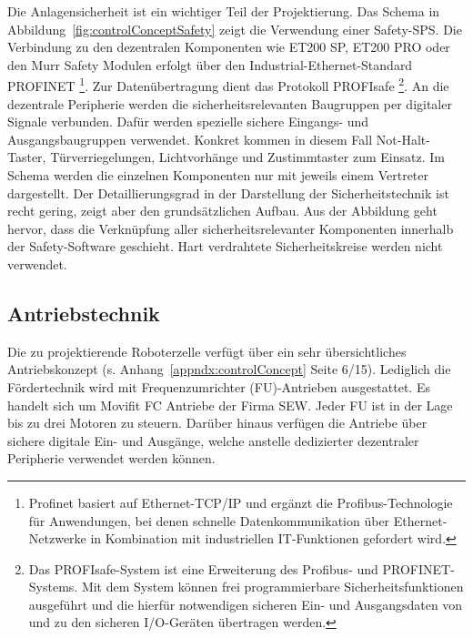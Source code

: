 Die Anlagensicherheit ist ein wichtiger Teil der Projektierung. Das Schema in Abbildung~\ref{fig:controlConceptSafety} zeigt die Verwendung einer Safety-SPS. Die Verbindung zu den dezentralen Komponenten wie ET200 SP, ET200 PRO oder den Murr Safety Modulen erfolgt über den Industrial-Ethernet-Standard PROFINET
\footnote{Profinet basiert auf Ethernet-TCP/IP und ergänzt die Profibus-Technologie für Anwendungen, bei denen schnelle Datenkommunikation über Ethernet-Netzwerke in Kombination mit industriellen IT-Funktionen gefordert wird. }.
Zur Datenübertragung dient das Protokoll PROFIsafe
\footnote{Das PROFIsafe-System ist eine Erweiterung des Profibus- und PROFINET-Systems. Mit dem System können frei programmierbare Sicherheitsfunktionen ausgeführt und die hierfür notwendigen sicheren Ein- und Ausgangsdaten von und zu den sicheren I/O-Geräten übertragen werden.}.
An die dezentrale Peripherie werden die sicherheitsrelevanten Baugruppen per digitaler Signale verbunden. Dafür werden spezielle sichere Eingangs- und Ausgangsbaugruppen verwendet. Konkret kommen in diesem Fall Not-Halt-Taster, Türverriegelungen, Lichtvorhänge und Zustimmtaster zum Einsatz. Im Schema werden die einzelnen Komponenten nur mit jeweils einem Vertreter dargestellt.
Der Detaillierungsgrad in der Darstellung der Sicherheitstechnik ist recht gering, zeigt aber den grundsätzlichen Aufbau. Aus der Abbildung geht hervor, dass die Verknüpfung aller sicherheitsrelevanter Komponenten innerhalb der Safety-Software geschieht. Hart verdrahtete Sicherheitskreise werden nicht verwendet.


\subsection{Antriebstechnik}


Die zu projektierende Roboterzelle verfügt über ein sehr übersichtliches Antriebskonzept (s. Anhang~\ref{appndx:controlConcept}  Seite 6/15). Lediglich die Fördertechnik wird mit Frequenzumrichter (FU)-Antrieben ausgestattet. Es handelt sich um Movifit FC Antriebe der Firma SEW. Jeder FU ist in der Lage bis zu drei Motoren zu steuern. Darüber hinaus verfügen die Antriebe über sichere digitale Ein- und Ausgänge, welche anstelle dedizierter dezentraler Peripherie verwendet werden können.

